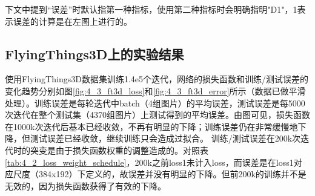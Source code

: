 下文中提到“误差”时默认指第一种指标，使用第二种指标时会明确指明"D1"，1表示误差的计算是在左图上进行的。

\subsection{FlyingThings3D上的实验结果}
使用FlyingThings3D数据集训练1.4e5个迭代，网络的损失函数和训练/测试误差的变化趋势分别如图\ref{fig:4_3_ft3d_loss}和\ref{fig:4_3_ft3d_error}所示（数据已做平滑处理）。训练误差是每轮迭代中batch（4组图片）的平均误差，测试误差是每5000次迭代在整个测试集（4370组图片）上测试得到的平均误差。由图可见，损失函数在1000k次迭代后基本已经收敛，不再有明显的下降；训练误差仍在非常缓慢地下降，但测试误差已经收敛，继续训练只会造成过拟合。
训练/测试误差在200k次迭代时的突变是由于损失函数权重的调整造成的。对照表\ref{tab:4_2_loss_weight_schedule}，200k之前loss1未计入loss，而误差是在loss1对应尺度（384x192）下定义的，故误差并没有明显的下降。但前200k的训练并不是无效的，因为损失函数获得了有效的下降。


